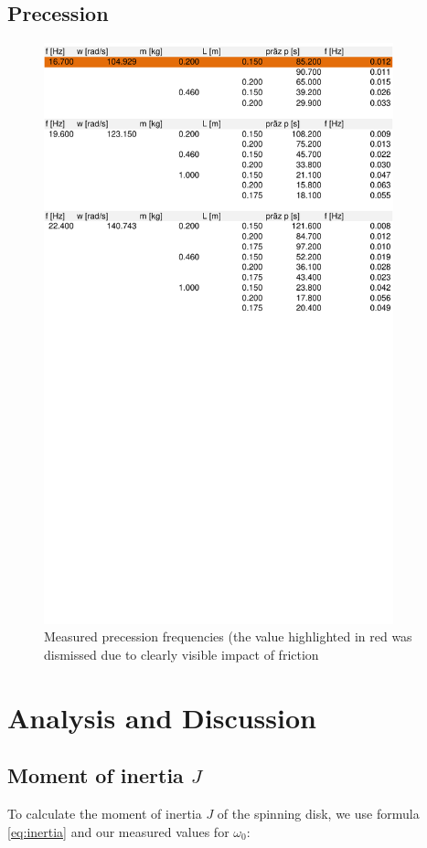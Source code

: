 \documentclass{scrreprt}
\begin{document}
\subsection{Precession}
\begin{figure}[H]
	\centering
  \includegraphics[width=0.9\textwidth]{diag/precession.pdf}
	\caption{Measured precession frequencies (the value highlighted in red was dismissed due to clearly visible impact of friction}
	\label{fig:precession}
\end{figure}

\section{Analysis and Discussion}

\subsection{Moment of inertia $J$}
To calculate the moment of inertia $J$ of the spinning disk, we use formula \ref{eq:inertia} and our measured values for $\omega_0$:
\end{document}
